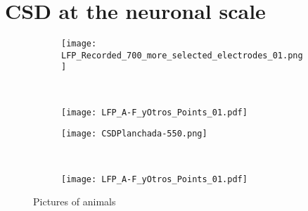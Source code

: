 \documentclass[letterpaper, 12pt]{article}
\begin{document}
\section*{CSD at the neuronal scale}

\begin{figure}
    \begin{subfigure}[t]{0.3\textwidth}
     \texttt{[image: LFP\_Recorded\_700\_more\_selected\_electrodes\_01.png]}
        \label{lfp01}
    \end{subfigure}
    ~ %
    \begin{subfigure}[b]{0.3\textwidth}
        \texttt{[image: LFP\_A-F\_yOtros\_Points\_01.pdf]}
        \label{lfptrazos}
    \end{subfigure}

    \begin{subfigure}[t]{0.3\textwidth}
     \texttt{[image: CSDPlanchada-550.png]}
        \label{lfp01}
    \end{subfigure}
    ~ %
    \begin{subfigure}[b]{0.3\textwidth}
        \texttt{[image: LFP\_A-F\_yOtros\_Points\_01.pdf]}
        \label{lfptrazos}
    \end{subfigure}

    
    \caption{Pictures of animals}\label{fig:animals}
\end{figure}
\end{document}
